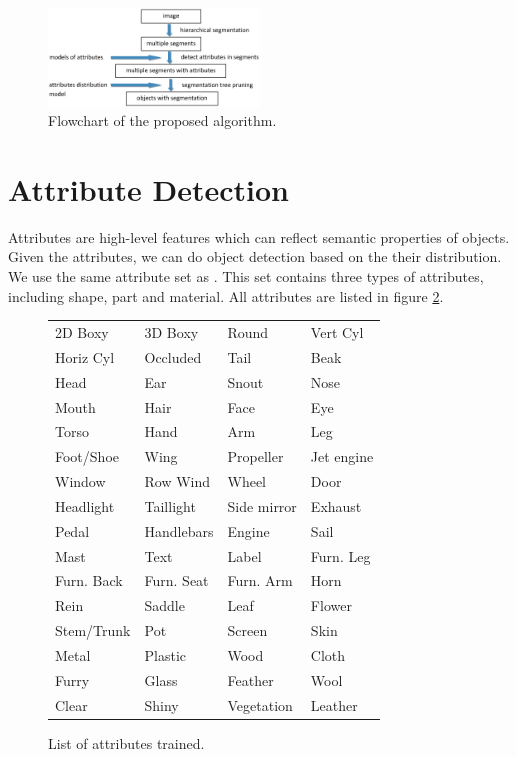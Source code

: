 \documentclass[10pt,twocolumn,letterpaper]{article}
\begin{document}
\begin{figure}
\centering
\includegraphics[width=0.5\textwidth]{figures/flowchart.eps}
\caption{Flowchart of the proposed algorithm.} \label{fig:flowchart}
\end{figure}


\section{Attribute Detection}
\label{sec:attribute}

Attributes are high-level features which can reflect semantic properties of objects. Given the attributes, we can do object detection based on the their distribution. We use the same attribute set as \cite{farhadi09}. This set contains three types of attributes, including shape, part and material. All attributes are listed in figure \ref{fig:atts}.

\begin{figure}
\begin{tabular}{llll}
2D Boxy & 3D Boxy & Round & Vert Cyl \\
Horiz Cyl & Occluded & Tail & Beak \\
Head & Ear & Snout & Nose \\
Mouth & Hair & Face & Eye \\
Torso & Hand & Arm & Leg \\
Foot/Shoe & Wing & Propeller & Jet engine \\
Window & Row Wind & Wheel & Door \\
Headlight & Taillight & Side mirror & Exhaust \\
Pedal & Handlebars & Engine & Sail \\
Mast & Text & Label & Furn. Leg \\
Furn. Back & Furn. Seat & Furn. Arm & Horn \\
Rein & Saddle & Leaf & Flower \\
Stem/Trunk & Pot & Screen & Skin \\
Metal & Plastic & Wood & Cloth \\
Furry & Glass & Feather & Wool \\
Clear & Shiny & Vegetation & Leather \\
\end{tabular}
\caption{List of attributes trained.}
\label{fig:atts}
\end{figure}
\end{document}
